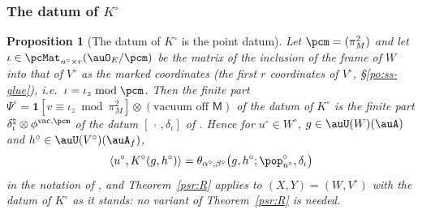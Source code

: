 \documentclass[10pt]{amsart}
\newtheorem{proposition}[theorem]{Proposition}
\theoremstyle{definition}
\theoremstyle{remark}
\begin{document}
\subsubsection{The datum of $K^\circ$}\label{psv:ss-datum}

\begin{proposition}[The datum of $K^\circ$ is the point datum]\label{psv:datum}
Let $\pcm=(\pi_M^2)$ and let $\iota\in\pcMat_{n^\circ\times r}(\auO_E/\pcm)$ be the matrix of the inclusion of the
frame of $W$ into that of $V^\circ$ as the marked coordinates \textup(the first $r$ coordinates of $V^\circ$,
\S\ref{po:ss-glue}\textup), i.e.\ $\iota=\iota_z\bmod\pcm$. Then the finite part $\Psi^\circ=\mathbf 1[v\equiv\iota_z
\bmod\pi_M^2]\otimes(\text{vacuum off }\mathsf M)$ of the datum of $K^\circ$ is the finite part
$\delta_\iota^\natural\otimes\phi^{\mathrm{vac},\pcm}$ of the datum $[\,\cdot\,,\delta_\iota]$ of {\cite[\S2.3]{P53}}.
Hence for $u^\circ\in W^\circ$, $g\in\auU(W)(\auA)$ and $h^\circ\in\auU(V^\circ)(\auA_f)$,
\[
\langle u^\circ,K^\circ(g,h^\circ)\rangle=\theta_{\alpha^\circ,\beta^\circ}\bigl(g,h^\circ;\pop^\circ_{u^\circ},\delta_\iota\bigr)
\]
in the notation of {\cite[\S2.3]{P53}}, and Theorem~\ref{psr:R} applies to $(X,Y)=(W,V^\circ)$ with the datum of
$K^\circ$ as it stands: no variant of Theorem~\ref{psr:R} is needed.
\end{proposition}
\end{document}
